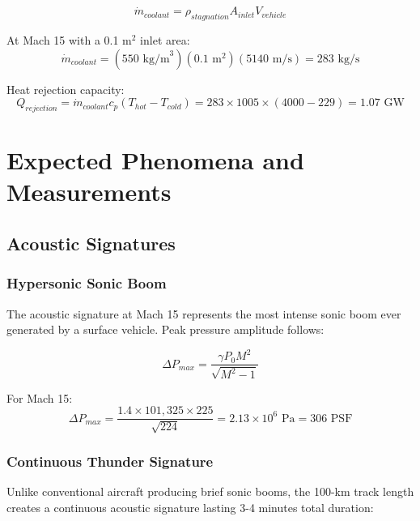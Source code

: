 \documentclass[12pt,a4paper]{article}
\begin{document}
\begin{equation}
\dot{m}_{coolant} = \rho_{stagnation} A_{inlet} V_{vehicle}
\label{eq:coolant_mass_flow}
\end{equation}

At Mach 15 with a 0.1 m$^2$ inlet area:
\begin{equation}
\dot{m}_{coolant} = (550 \text{ kg/m}^3)(0.1 \text{ m}^2)(5140 \text{ m/s}) = 283 \text{ kg/s}
\label{eq:mass_flow_calc}
\end{equation}

Heat rejection capacity:
\begin{equation}
Q_{rejection} = \dot{m}_{coolant} c_p (T_{hot} - T_{cold}) = 283 \times 1005 \times (4000-229) = 1.07 \text{ GW}
\label{eq:heat_rejection}
\end{equation}

\section{Expected Phenomena and Measurements}

\subsection{Acoustic Signatures}

\subsubsection{Hypersonic Sonic Boom}
The acoustic signature at Mach 15 represents the most intense sonic boom ever generated by a surface vehicle. Peak pressure amplitude follows:

\begin{equation}
\Delta P_{max} = \frac{\gamma P_0 M^2}{\sqrt{M^2-1}}
\label{eq:sonic_boom_pressure}
\end{equation}

For Mach 15:
\begin{equation}
\Delta P_{max} = \frac{1.4 \times 101,325 \times 225}{\sqrt{224}} = 2.13 \times 10^6 \text{ Pa} = 306 \text{ PSF}
\label{eq:boom_pressure_calc}
\end{equation}

\subsubsection{Continuous Thunder Signature}
Unlike conventional aircraft producing brief sonic booms, the 100-km track length creates a continuous acoustic signature lasting 3-4 minutes total duration:
\end{document}
